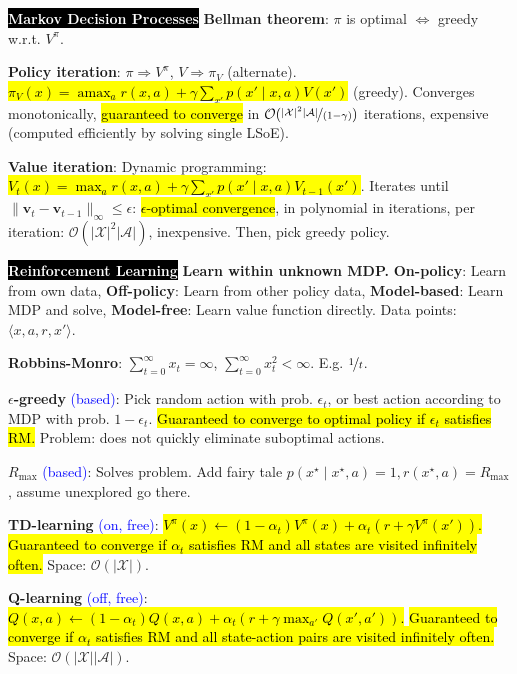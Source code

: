 \documentclass{article}
\newcommand{\blue}[1]{\textcolor{blue}{#1}}
\DeclareRobustCommand{\hleq}[1]{{\sethlcolor{pink} \hl{#1}}}
\DeclareMathOperator*{\argmax}{amax}
\newenvironment{topic}[1]
{\textbf{\sffamily  \colorbox{black}{\textcolor{white}{#1}}}}
{}
\begin{document}
\begin{multicols*}{3}
\begin{topic}{Markov Decision Processes}
    \textbf{Bellman theorem}: $\pi$ is optimal $\Leftrightarrow$ greedy
    w.r.t. $V^\pi$.

    \textbf{Policy iteration}: $\pi \Rightarrow V^\pi$, $V \Rightarrow \pi_V$
    (alternate). \hl{$\pi_V(x) = \argmax_{a} r(x,a) + \gamma \sum_{x'} p(x'\mid
    x, a) V(x')$} (greedy). Converges monotonically, \hl{guaranteed to
    converge} in
    $\mathcal{O}(\nicefrac{|\mathcal{X}|^2|\mathcal{A}|}{(1-\gamma)})$
    iterations, expensive (computed efficiently by solving single LSoE).

    \textbf{Value iteration}: Dynamic programming: \hl{$V_t(x) = \max_a r(x,a) +
    \gamma \sum_{x'} p(x'\mid x,a) V_{t-1}(x')$}. Iterates until $\| \bm{v}_t -
    \bm{v}_{t-1} \|_{\infty} \leq \epsilon$: \hl{$\epsilon$-optimal convergence}, in
    polynomial in iterations, per iteration: $\mathcal{O}(|\mathcal{X}|^2
    |\mathcal{A}|)$, inexpensive. Then, pick greedy policy.
  \end{topic}

  \begin{topic}{Reinforcement Learning}
    \textbf{Learn within unknown MDP.} \textbf{On-policy}: Learn from own data,
    \textbf{Off-policy}: Learn from other policy data, \textbf{Model-based}:
    Learn MDP and solve, \textbf{Model-free}: Learn value function directly.
    Data points: $\langle x,a,r,x' \rangle$.

    \textbf{Robbins-Monro}: $\sum_{t=0}^\infty x_t = \infty$,
    $\sum_{t=0}^\infty x_t^2 < \infty$. E.g. $\nicefrac{1}{t}$.

    \textbf{$\epsilon$-greedy} \blue{(based)}: Pick random action with prob.
    $\epsilon_t$, or best action according to MDP with prob. $1-\epsilon_t$.
    \hl{Guaranteed to converge to optimal policy if $\epsilon_t$ satisfies RM.}
    Problem: does not quickly eliminate suboptimal actions.

    \textbf{$R_{\max}$} \blue{(based)}: Solves problem. Add fairy tale
    $p(x^\star\mid x^\star,a) = 1, r(x^\star, a)=R_{\max}$, assume unexplored
    go there.

    \textbf{TD-learning} \blue{(on, free)}: \hleq{$V^\pi(x) \gets (1-\alpha_t)
    V^\pi(x)+\alpha_t (r + \gamma V^\pi(x'))$.} \hl{Guaranteed to converge if
    $\alpha_t$ satisfies RM and all states are visited infinitely often.} Space:
    $\mathcal{O}(|\mathcal{X}|)$.

    \textbf{Q-learning} \blue{(off, free)}: \hleq{$Q(x,a) \gets (1-\alpha_t)
    Q(x,a) + \alpha_t(r+\gamma \max_{a'} Q(x',a'))$.} \hl{Guaranteed to
    converge if $\alpha_t$ satisfies RM and all state-action pairs are visited
    infinitely often.} Space: $\mathcal{O}(|\mathcal{X}||\mathcal{A}|)$.


\end{topic}
\end{multicols*}
\end{document}
